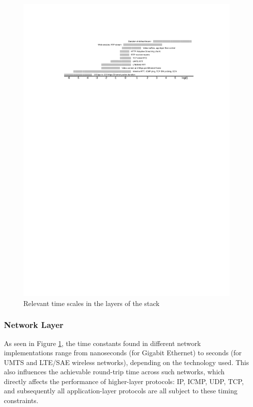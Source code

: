 \begin{figure}[htbp]
	\includegraphics[width=\textwidth]{images/timescales.pdf}
	\caption{Relevant time scales in the layers of the stack}
	\label{c3:fig:timescales}
\end{figure}



\subsubsection{Network Layer}

As seen in Figure \ref{c3:fig:timescales}, the time constants found in different network implementations range from nanoseconds (for Gigabit Ethernet) to seconds (for UMTS and LTE/SAE wireless networks), depending on the technology used. This also influences the achievable round-trip time across such networks, which directly affects the performance of higher-layer protocols: IP, ICMP, UDP, TCP, and subsequently all application-layer protocols are all subject to these timing constraints.

